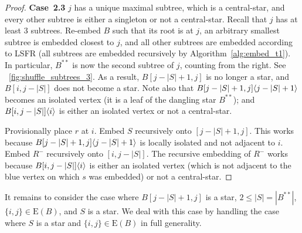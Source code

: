 \documentclass[11pt,a4paper,colorlinks=true,urlcolor=blue,citecolor=red]{article}
\theoremstyle{plain}
\newcommand{\case}[1]{\par\vspace{.5\baselineskip}\noindent\textbf{\sffamily Case~#1}}
\newcommand{\EB}{\mathrm{E}(B)}
\begin{document}
\begin{proof}
  \case{2.3} $j$ has a unique maximal subtree, which is a central-star,
  and every other subtree is either a singleton or not a central-star.
  Recall that $j$ has at least 3 subtrees. Re-embed $B$ such that its
  root is at $j$, an arbitrary smallest subtree is embedded closest to
  $j$, and all other subtrees are embedded according to LSFR (all
  subtrees are embedded recursively by Algorithm~\ref{alg:embed_t1}). In
  particular, $B^{**}$ is now the second subtree of $j$, counting from
  the right. See \figurename~\ref{fig:shuffle_subtrees_3}. As a result,
  $B[j-|S|+1,j]$ is no longer a star, and $B[i,j-|S|]$ does not become a
  star. Note also that $B{[j-|S|+1,j]}\langle{j-|S|+1}\rangle$ becomes an
  isolated vertex (it is a leaf of the dangling star $B^{**}$); and
  $B{[i,j-|S|]}\langle{i}\rangle$ is either an isolated vertex or not a
  central-star.

  Provisionally place $r$ at $i$. Embed $S$ recursively onto
  $[j-|S|+1,j]$. This works because $B{[j-|S|+1,j]}\langle{j-|S|+1}\rangle$ is
  locally isolated and not adjacent to $i$. Embed $R^-$ recursively onto
  $[i,j-|S|]$. The recursive embedding of $R^-$ works because
  $B{[i,j-|S|]}\langle{i}\rangle$ is either an isolated vertex (which is not
  adjacent to the blue vertex on which $s$ was embedded) or not a
  central-star.
\end{proof}

It remains to consider the case where $B[j-|S|+1,j]$ is a star, $2\leq
|S|=|B^{**}|$, $\{i,j\}\in\EB$, and $S$ is a star. We deal with this
case by handling the case where $S$ is a star and $\{i,j\}\in\EB$ in
full generality.
\end{document}
